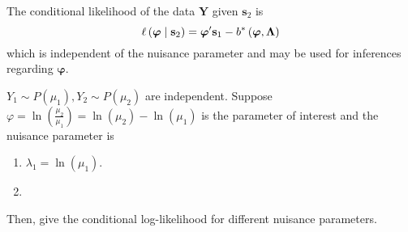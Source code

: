 The conditional likelihood of the data \(\mathbf{Y}\) given \(\mathbf{s}_{2}\) is
\begin{equation}
	\ell\left(\boldsymbol{\varphi}\mid\mathbf{s}_{2}\right)=\boldsymbol{\varphi}^{\prime}\mathbf{s}_{1}-b^{*}\left(\boldsymbol{\varphi},\boldsymbol{\Lambda}\right)
\end{equation}
which is independent of the nuisance parameter and may be used for inferences regarding \(\boldsymbol{\varphi}\).

\begin{example}
	\(Y_{1}\sim P\left(\mu_{1}\right),Y_{2}\sim P\left(\mu_{2}\right)\) are independent. Suppose \(\varphi=\ln\left(\frac{\mu_{2}}{\mu_{1}}\right)=\ln\left(\mu_{2}\right)-\ln\left(\mu_{1}\right)\) is the parameter of interest and the nuisance parameter is
	\begin{enumerate}
		\item \(\lambda_{1}=\ln\left(\mu_{1}\right)\).
		\item
	\end{enumerate}
	Then, give the conditional log-likelihood for different nuisance parameters.
\end{example}

